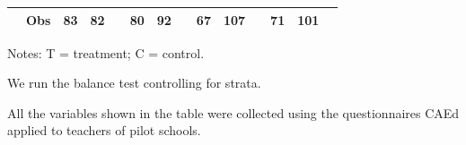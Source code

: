 \documentclass[
	article,			%
	12pt,				%
	oneside,			%
	a4paper,			%
	]{article}
\begin{document}
\begin{table}[h!]
\begin{tabular}{lp{2.335em}p{1.915em}p{2.085em}cp{1.915em}p{1.915em}cp{1.915em}p{1.915em}cp{1.915em}p{1.915em}c}
           &        Obs &         83 &         82 &            &         80 &         92 &            &         67 &        107 &            &         71 &        101 &            \\

\hline
\end{tabular}  

\label{tab:teacherscar}%
\begin{tablenotes}
\fontsize{9}{9}\selectfont 
\item Notes: T = treatment; C = control.
\item We run the balance test controlling for strata. 
\item All the variables shown in the table were collected using the questionnaires CAEd applied to teachers of pilot schools. 
\end{tablenotes}
\end{table}%
\end{document}
